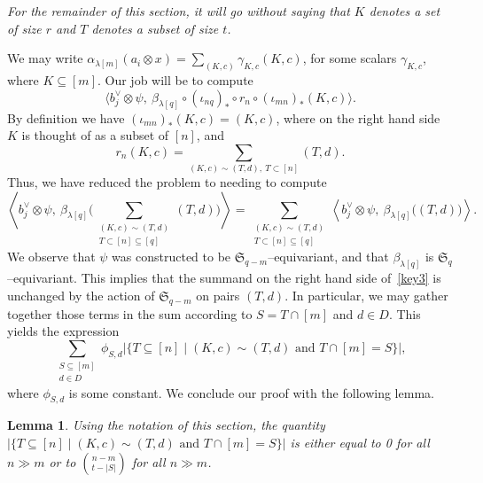 \documentclass[10pt]{amsart}
\newcommand{\Sn}{\mathfrak{S}}
\newtheorem{lemma}[theorem]{Lemma}
\theoremstyle{definition}
\begin{document}
\emph{For the remainder of this section, it will go without saying that $K$ denotes a set of size $r$ and $T$ denotes a subset of size $t$.}

We may write $\alpha_{\lambda[m]}(a_i \otimes x) = \sum_{(K,c)} \gamma_{K,c} (K,c)$, for some scalars $\gamma_{K,c}$, where $K \subseteq [m]$. Our job will be to compute
\[
\langle b_j^\vee \otimes \psi,\ \beta_{\lambda[q]} \circ (\iota_{nq})_\ast \circ r_n \circ (\iota_{mn})_\ast(K,c) \rangle .
\]
By definition we have $(\iota_{mn})_\ast(K,c) = (K,c)$, where on the right hand side $K$ is thought of as a subset of $[n]$, and 
\[
r_n(K,c) = \sum_{(K,c) \sim (T,d), \ T \subset [n]}(T,d).
\]
Thus, we have reduced the problem to needing to compute
\begin{equation}
\left\langle b_j^\vee \otimes \psi,\ \beta_{\lambda[q]}{\Bigg(} \sum_{\substack{ (K,c) \sim (T,d) \\ T \subset [n] \subseteq [q]}} (T,d) {\Bigg)} \right\rangle = 
\sum_{\substack{ (K,c) \sim (T,d) \\ T \subset [n] \subseteq [q]}} \left\langle b_j^\vee \otimes \psi,\ \beta_{\lambda[q]}{\Big(} (T,d) {\Big)} \right\rangle
.\label{key3}
\end{equation}
We observe that $\psi$ was constructed to be $\Sn_{q-m}$--equivariant, and that $\beta_{\lambda[q]}$ is $\Sn_{q}$--equivariant. 
This implies that the summand on the right hand side of~\eqref{key3} is unchanged by the action of $\Sn_{q-m}$ on pairs $(T,d)$. In particular, we may gather together those terms in the sum
according to $S = T \cap [m]$ and $d \in D$. This yields the expression
\[
\sum_{\substack{S \subseteq [m]\\ d \in D}} \phi_{S,d} \left| \{T \subseteq [n] \mid (K,c) \sim (T,d) \text{ and } T \cap [m] = S\}\right|,
\]
where $\phi_{S,d}$ is some constant. We conclude our proof with the following lemma.


\begin{lemma}
Using the notation of this section, the quantity $|\{T \subseteq [n] \mid (K,c) \sim (T,d) \text{ and } T \cap [m] = S\}|$ is either equal to 0 for all $n \gg m$ or to $\binom{n-m}{t - |S|}$ for all $n \gg m$. 
\end{lemma}
\end{document}
